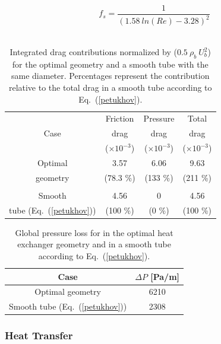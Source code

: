 \begin{equation}
f_s = \frac{1}{(1.58 ~ ln(Re) - 3.28)^2}
\label{petukhov}
\end{equation}\\

\begin{table}
\small
\centering
\begin{tabular}{c|ccc}
   & Friction & Pressure & Total \\
  Case & drag  & drag & drag \\
   & ($\times 10^{-3}$) & ($\times 10^{-3}$) & ($\times 10^{-3}$) \\
  \hline
  Optimal & 3.57 & 6.06 & 9.63 \\
  geometry & (78.3 \%) & (133 \%) & (211 \%) \\
   & & & \\
  Smooth & 4.56 & 0 & 4.56 \\
  tube (Eq.~(\ref{petukhov})) & (100 \%) & (0 \%) & (100 \%) \\
  \hline
\end{tabular}
\caption{Integrated drag contributions normalized by ($0.5 ~ \rho_b ~ U_b^2$) for the optimal geometry and a smooth tube with the same diameter. Percentages represent the contribution relative to the total drag in a smooth tube according to Eq.~(\ref{petukhov}).}
\label{tab_drags}
\end{table}

\begin{table}
\small
\centering
\begin{tabular}{cc}
  Case & $\Delta P$ [Pa/m] \\
  \hline
  Optimal geometry & 6210 \\
  Smooth tube (Eq.~(\ref{petukhov})) & 2308 \\
  \hline
\end{tabular}
\caption{Global pressure loss for in the optimal heat exchanger geometry and in a smooth tube according to Eq.~(\ref{petukhov}).}
\label{tab_pressureloss}
\end{table}

\subsubsection{Heat Transfer}


